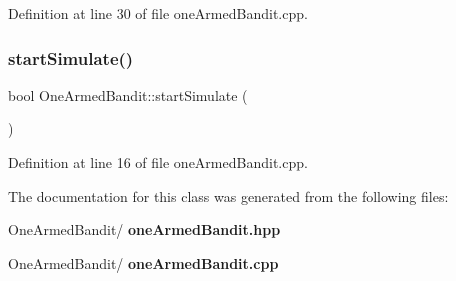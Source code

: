 Definition at line 30 of file one\+Armed\+Bandit.\+cpp.

\mbox{\label{class_one_armed_bandit_a8cf2610e14b939c87e84625931826bc5}} 
\subsubsection{start\+Simulate()}
{\footnotesize\ttfamily bool One\+Armed\+Bandit\+::start\+Simulate (\begin{DoxyParamCaption}{ }\end{DoxyParamCaption})}



Definition at line 16 of file one\+Armed\+Bandit.\+cpp.



The documentation for this class was generated from the following files\+:\begin{DoxyCompactItemize}
\item 
One\+Armed\+Bandit/\textbf{ one\+Armed\+Bandit.\+hpp}\item 
One\+Armed\+Bandit/\textbf{ one\+Armed\+Bandit.\+cpp}\end{DoxyCompactItemize}
